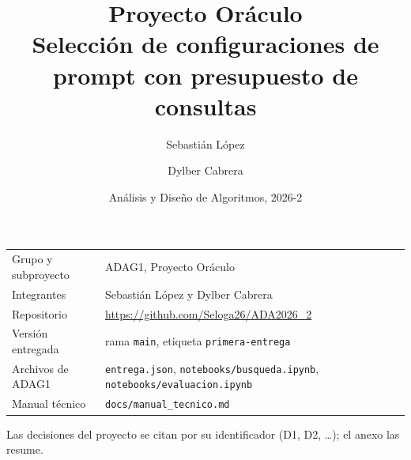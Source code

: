 \documentclass[11pt,a4paper]{article}
\title{Proyecto Oráculo\\[0.5em] \large Selección de configuraciones de prompt con presupuesto de consultas}
\author{Sebastián López \and Dylber Cabrera}
\date{Análisis y Diseño de Algoritmos, 2026-2}
\begin{document}
\maketitle

\begin{center}
\begin{tabular}{lp{}}
\toprule
Grupo y subproyecto & ADAG1, Proyecto Oráculo \\
Integrantes & Sebastián López y Dylber Cabrera \\
Repositorio & \url{https://github.com/Seloga26/ADA2026_2} \\
Versión entregada & rama \texttt{main}, etiqueta \texttt{primera-entrega} \\
Archivos de ADAG1 & \texttt{entrega.json}, \texttt{notebooks/busqueda.ipynb},
\texttt{notebooks/evaluacion.ipynb} \\
Manual técnico & \texttt{docs/manual\_tecnico.md} \\
\bottomrule
\end{tabular}
\end{center}

Las decisiones del proyecto se citan por su identificador (D1, D2, \dots); el anexo las
resume.

\tableofcontents
\newpage









\nocite{*}



\appendix

\end{document}
